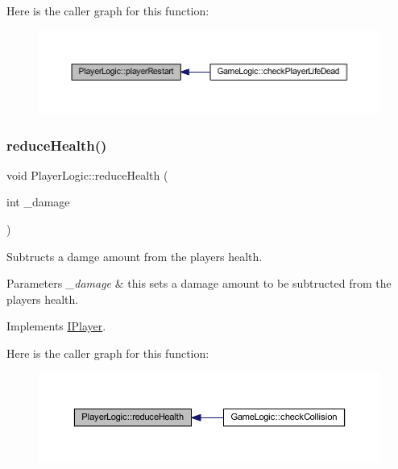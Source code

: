 Here is the caller graph for this function\+:
\nopagebreak
\begin{figure}[H]
\begin{center}
\leavevmode
\includegraphics[width=350pt]{class_player_logic_aaaf0e8356e5af9753015960be7727724_icgraph}
\end{center}
\end{figure}
\mbox{\label{class_player_logic_a43c4cfcdfd439ff3ef8015c2170f9381}} 
\subsubsection{\texorpdfstring{reduce\+Health()}{reduceHealth()}}
{\footnotesize\ttfamily void Player\+Logic\+::reduce\+Health (\begin{DoxyParamCaption}\item[{int}]{\+\_\+damage }\end{DoxyParamCaption})\hspace{0.3cm}{\ttfamily [virtual]}}



Subtructs a damge amount from the players health. 


\begin{DoxyParams}{Parameters}
{\em \+\_\+damage} & this sets a damage amount to be subtructed from the players health. \\
\hline
\end{DoxyParams}


Implements \hyperlink{class_i_player_a27eab471444f8ae2cf96bee562488b70}{I\+Player}.

Here is the caller graph for this function\+:
\nopagebreak
\begin{figure}[H]
\begin{center}
\leavevmode
\includegraphics[width=350pt]{class_player_logic_a43c4cfcdfd439ff3ef8015c2170f9381_icgraph}
\end{center}
\end{figure}
\mbox{\label{class_player_logic_a3139e107a0eb76e7307f8657818b3007}} 
